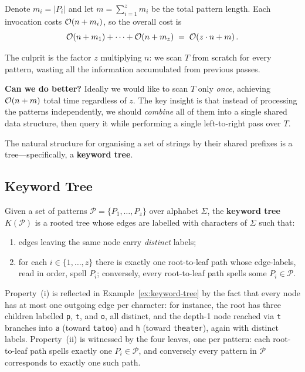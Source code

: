 Denote $m_i = |P_i|$ and let $m = \displaystyle\sum_{i=1}^{z} m_i$ be the
total pattern length.
Each invocation costs $\mathcal{O}\!\left(n + m_i\right)$, so the overall cost is
\[
  \mathcal{O}\!\left(n + m_1\right) + \cdots + \mathcal{O}\!\left(n + m_z\right)
  \;=\; \mathcal{O}\!\left(z \cdot n + m\right).
\]


The culprit is the factor $z$ multiplying $n$: we scan $T$ from scratch
for every pattern, wasting all the information accumulated from previous
passes.

\textbf{Can we do better?}
Ideally we would like to scan $T$ only \emph{once}, achieving
$\mathcal{O}\!\left(n + m\right)$ total time regardless of $z$.
The key insight is that instead of processing the patterns independently,
we should \emph{combine} all of them into a single shared data structure,
then query it while performing a single left-to-right pass over $T$.

The natural structure for organising a set of strings by their shared
prefixes is a tree---specifically, a \textbf{keyword tree}.

\subsection{Keyword Tree}

\begin{definition}
  Given a set of patterns $\mathcal{P} = \{P_1, \ldots, P_z\}$ over alphabet
  $\Sigma$, the \textbf{keyword tree} $K(\mathcal{P})$ is a rooted tree whose
  edges are labelled with characters of $\Sigma$ such that:
  \begin{enumerate}[label=(\roman*), leftmargin=2em]
    \item edges leaving the same node carry \emph{distinct} labels;
    \item for each $i \in \{1,\ldots,z\}$ there is exactly one root-to-leaf
          path whose edge-labels, read in order, spell $P_i$; conversely,
          every root-to-leaf path spells some $P_i \in \mathcal{P}$.
  \end{enumerate}
\end{definition}

Property~(i) is reflected in Example~\ref{ex:keyword-tree} by the fact
that every node has at most one outgoing edge per character: for instance,
the root has three children labelled \texttt{p}, \texttt{t}, and
\texttt{o}, all distinct, and the depth-1 node reached via \texttt{t}
branches into \texttt{a} (toward \texttt{tatoo}) and \texttt{h} (toward
\texttt{theater}), again with distinct labels.
Property~(ii) is witnessed by the four leaves, one per pattern: each
root-to-leaf path spells exactly one $P_i \in \mathcal{P}$, and
conversely every pattern in $\mathcal{P}$ corresponds to exactly one such
path.

